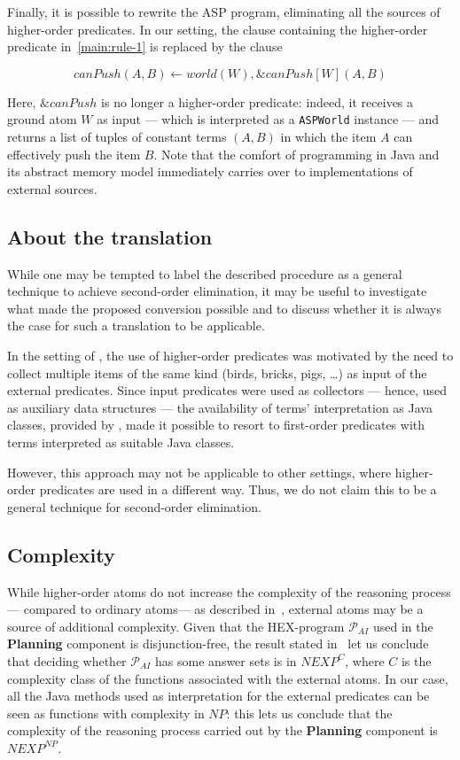 Finally, it is possible to rewrite the ASP program, eliminating all the sources of higher-order predicates.
In our setting, the clause containing the higher-order predicate in~\eqref{main:rule-1} is replaced by the clause

$$ canPush(A,B) \leftarrow world(W), \&canPush[W](A,B) \label{main:rule-3} $$

Here, $\&canPush$ is no longer a higher-order predicate: indeed, it receives a ground atom $W$ as input --- which is interpreted as a \texttt{ASPWorld} instance --- and returns a list of tuples of constant terms $(A,B)$ in which the item $A$ can effectively push the item $B$. Note that the comfort of programming in Java and its abstract memory model immediately carries over to implementations of external sources.

\subsection{About the translation}

While one may be tempted to label the described procedure as a general technique to achieve second-order elimination, it may be useful to investigate what made the proposed conversion possible and to discuss whether it is always the case for such a translation to be applicable.

In the setting of \ah, the use of higher-order predicates was motivated by the need to collect multiple items of the same kind (birds, bricks, pigs, \ldots) as input of the external predicates.
Since input predicates were used as collectors --- hence, used as auxiliary data structures --- the availability of terms' interpretation as Java classes, provided by \al, made it possible to resort to first-order predicates with terms interpreted as suitable Java classes.

However, this approach may not be applicable to other settings, where higher-order predicates are used in a different way.
Thus, we do not claim this to be a general technique for second-order elimination.

\subsection{Complexity}

While higher-order atoms do not increase the complexity of the reasoning process --- compared to ordinary atoms--- as described in~\cite{hex}, external atoms may be a source of additional complexity.
Given that the HEX-program $\mathcal{P}_{AI}$ used in the \textbf{Planning} component is disjunction-free, the result stated in~\cite[Theorem 8]{hex} let us conclude that deciding whether $\mathcal{P}_{AI}$ has some answer sets is in $NEXP^C$, where $C$ is the complexity class of the functions associated with the external atoms.
In our case, all the Java methods used as interpretation for the external predicates can be seen as functions with complexity in $NP$: this lets us conclude that the complexity of the reasoning process carried out by the \textbf{Planning} component is $NEXP^{NP}$.
